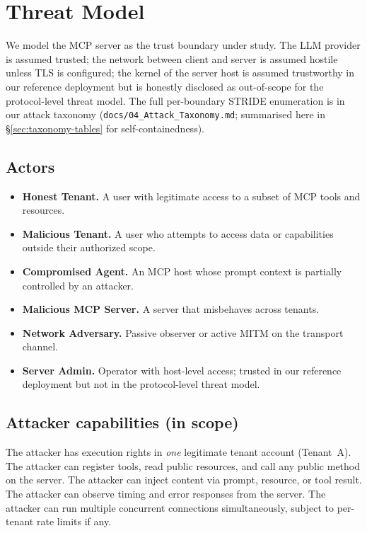 
\section{Threat Model}\label{sec:threat_model}

We model the MCP server as the trust boundary under study. The
LLM provider is assumed trusted; the network between client and
server is assumed hostile unless TLS is configured; the kernel
of the server host is assumed trustworthy in our reference
deployment but is honestly disclosed as out-of-scope for the
protocol-level threat model. The full per-boundary STRIDE
enumeration is in our attack taxonomy
(\texttt{docs/04\_Attack\_Taxonomy.md}; summarised here in
\S\ref{sec:taxonomy-tables} for self-containedness).

\subsection{Actors}

\begin{itemize}
  \item \textbf{Honest Tenant.} A user with legitimate access to
        a subset of MCP tools and resources.
  \item \textbf{Malicious Tenant.} A user who attempts to access
        data or capabilities outside their authorized scope.
  \item \textbf{Compromised Agent.} An MCP host whose prompt
        context is partially controlled by an attacker.
  \item \textbf{Malicious MCP Server.} A server that misbehaves
        across tenants.
  \item \textbf{Network Adversary.} Passive observer or active
        MITM on the transport channel.
  \item \textbf{Server Admin.} Operator with host-level access;
        trusted in our reference deployment but not in the
        protocol-level threat model.
\end{itemize}

\subsection{Attacker capabilities (in scope)}

The attacker has execution rights in \emph{one} legitimate tenant
account (Tenant~A). The attacker can register tools, read public
resources, and call any public method on the server. The
attacker can inject content via prompt, resource, or tool
result. The attacker can observe timing and error responses from
the server. The attacker can run multiple concurrent connections
simultaneously, subject to per-tenant rate limits if any.


